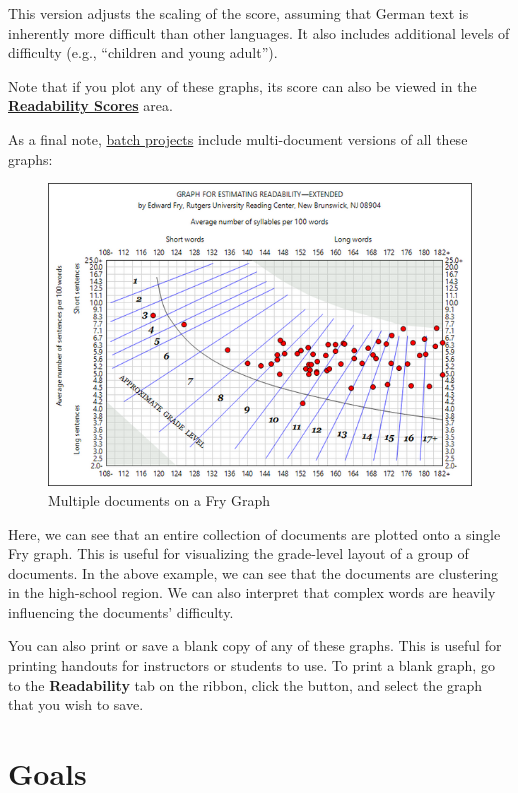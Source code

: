 \documentclass[
]{book}
\theoremstyle{definition}
\theoremstyle{definition}
\theoremstyle{definition}
\theoremstyle{definition}
\theoremstyle{remark}
\begin{document}
This version adjusts the scaling of the score, assuming that German text is inherently more difficult than other languages. It also includes additional levels of difficulty (e.g., ``children and young adult'').

Note that if you plot any of these graphs, its score can also be viewed in the \protect\hyperlink{reviewing-test-scores}{\textbf{Readability Scores}} area.

As a final note, \protect\hyperlink{creating-batch-project}{batch projects} include multi-document versions of all these graphs:

\begin{figure}[H]

{\centering \includegraphics[width=0.75\linewidth,]{Images/MultipleFry} 

}

\caption{Multiple documents on a Fry Graph}\label{fig:multifry}
\end{figure}

Here, we can see that an entire collection of documents are plotted onto a single Fry graph. This is useful for visualizing the grade-level layout of a group of documents. In the above example, we can see that the documents are clustering in the high-school region. We can also interpret that complex words are heavily influencing the documents' difficulty.

You can also print or save a blank copy of any of these graphs. This is useful for printing handouts for instructors or students to use. To print a blank graph, go to the \textbf{Readability} tab on the ribbon, click the  button, and select the graph that you wish to save.

\hypertarget{reviewing-goals}{%
\section{Goals}\label{reviewing-goals}}
\end{document}
